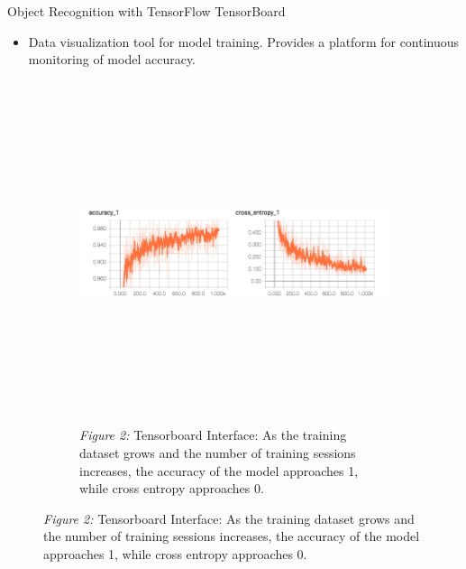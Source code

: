 \documentclass[22pt]{beamer}
\begin{document}
\begin{frame}[fragile]
\begin{textblock}{7.25}
\begin{block}{Object Recognition with TensorFlow}
TensorBoard
\begin{itemize}
\item Data visualization tool for model training. Provides a platform for continuous monitoring of model accuracy. 
\end{itemize}
\begin{figure}[htbp] %
\begin{subfigure}{0.95\textwidth}
   \centering
   \includegraphics[height=10cm]{interface.png}
   \caption*{\textit{Figure 2:} Tensorboard Interface:  As the training dataset grows and the number of training sessions increases, the accuracy of the model approaches 1, while cross entropy approaches 0.}
   \label{fig:interface}
\end{subfigure}
\end{figure}
\end{block}
\end{textblock}


\end{frame}
\end{document}
